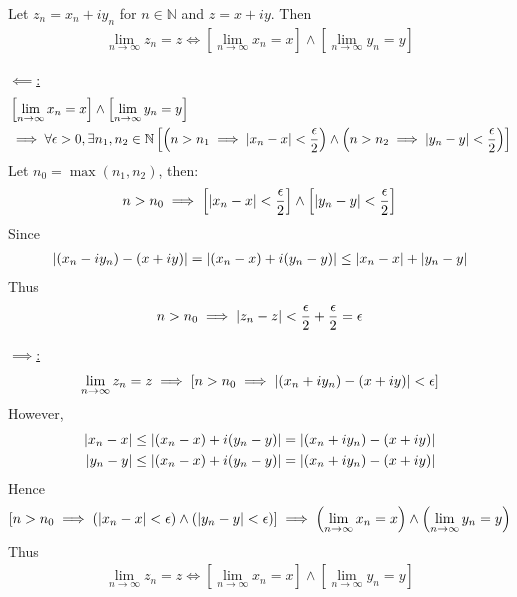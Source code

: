 \documentclass[12pt, english]{book}
\makeatletter
\renewenvironment{proof}[1][\proofname]{\par
	\pushQED{\qed}%
	\normalfont \topsep6\p@\@plus6\p@\relax
	\list{}{%
		\settowidth{\leftmargin}{\itshape\proofname:\hskip\labelsep}%
		\setlength{\labelwidth}{0pt}%
		\setlength{\itemindent}{-\leftmargin}%
	}%
	\item[\hskip\labelsep\itshape#1\@addpunct{:}]\ignorespaces
}{%
	\popQED\endlist\@endpefalse
}
\makeatother
\begin{document}
	\begin{theorem}
		Let \(z_n = x_n + i y_n\) for \(n \in \mathbb{N}\) and \(z = x + iy\). Then 
		\begin{align*}
			\lim_{n \rightarrow \infty} z_n = z 
			\iff \left[\lim_{n \rightarrow \infty} x_n = x \right] \land 
				 \left[\lim_{n \rightarrow \infty} y_n = y \right] 
		\end{align*}
	\end{theorem}
	\begin{proof}
		\underline{\(\impliedby \):}		
		\begin{align*}
			&\left[\lim_{n \rightarrow \infty} x_n = x \right] \land 
			 \left[\lim_{n \rightarrow \infty} y_n = y \right] \\
			&\implies \forall \epsilon > 0, \exists n_1, n_2 \in \mathbb{N}
				\left[\left(n > n_1 \implies \abs{x_n - x} < \frac{\epsilon}{2}\right) \land \left(n > n_2 \implies \abs{y_n - y} < \frac{\epsilon}{2}\right)\right]
		\end{align*}
		Let \(n_0 = \max(n_1, n_2)\), then:
		\begin{align*}
			n > n_0 
			\implies \left[\abs{x_n - x} < \frac{\epsilon}{2} \right]
				\land \left[\abs{y_n - y} < \frac{\epsilon}{2} \right]
		\end{align*}
		Since
		\begin{align*}
			\abs{(x_n - i y_n) - (x + iy)} = \abs{(x_n - x) + i(y_n - y)} \leq \abs{x_n - x} + \abs{y_n - y}
		\end{align*}
		Thus 
		\begin{align*}
			n > n_0 \implies \abs{z_n - z} < \frac{\epsilon}{2} + \frac{\epsilon}{2} = \epsilon
		\end{align*}
		
		\underline{\(\implies\):} 
		\begin{align*}
			\lim_{n \rightarrow \infty} z_n = z 
			\implies \left[n > n_0 \implies \abs{(x_n + iy_n) - (x + iy)} < \epsilon \right]
		\end{align*}
		However,
		\begin{align*}
			\abs{x_n - x} &\leq \abs{(x_n - x) + i(y_n - y)} = \abs{(x_n + iy_n) - (x + iy)}  \\
			\abs{y_n - y} &\leq \abs{(x_n - x) + i(y_n - y)} = \abs{(x_n + iy_n) - (x + iy)} 
		\end{align*}
		Hence 
		\begin{align*}
			\left[ 
			n > n_0 
			\implies\left(\abs{x_n - x} < \epsilon \right)
				\land \left(\abs{y_n - y} < \epsilon \right)
			\right]
			\implies \left(\lim_{n \rightarrow \infty} x_n = x \right)
				\land \left(\lim_{n \rightarrow \infty} y_n = y \right)
		\end{align*}
		Thus 
		\begin{align*}
			\lim_{n \rightarrow \infty} z_n = z 
			\iff \left[\lim_{n \rightarrow \infty} x_n = x \right] \land 
			\left[\lim_{n \rightarrow \infty} y_n = y \right] 
		\end{align*}
	\end{proof}
\end{document}
